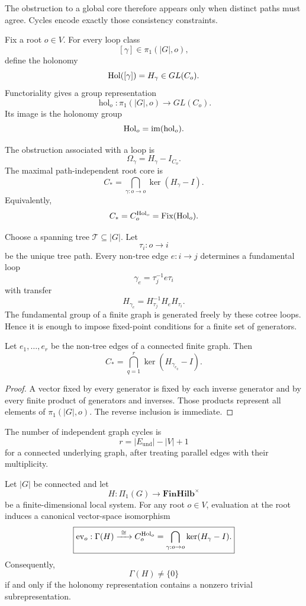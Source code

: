 The obstruction to a global core therefore appears only when distinct paths
must agree. Cycles encode exactly those consistency constraints.


Fix a root \(o\in V\). For every loop class
\[
[\gamma]\in\pi_1(|G|,o),
\]
define the holonomy
\[
\operatorname{Hol}([\gamma])=H_\gamma\in GL(C_o).
\]
Functoriality gives a group representation
\[
\operatorname{hol}_o:
\pi_1(|G|,o)\longrightarrow GL(C_o).
\]
Its image is the holonomy group
\[
\operatorname{Hol}_o=\operatorname{im}(\operatorname{hol}_o).
\]

The obstruction associated with a loop is
\[
\Omega_\gamma=H_\gamma-I_{C_o}.
\]
The maximal path-independent root core is
\[
\boxed{
C_*
=
\bigcap_{\gamma:o\to o}\ker(H_\gamma-I).
}
\]
Equivalently,
\[
C_*=C_o^{\operatorname{Hol}_o}=\operatorname{Fix}(\operatorname{Hol}_o).
\]


Choose a spanning tree \(\mathcal T\subseteq|G|\). Let
\[
\tau_i:o\to i
\]
be the unique tree path. Every non-tree edge \(e:i\to j\) determines a
fundamental loop
\[
\gamma_e=\tau_j^{-1}e\tau_i
\]
with transfer
\[
H_{\gamma_e}=H_{\tau_j}^{-1}H_eH_{\tau_i}.
\]
The fundamental group of a finite graph is generated freely by these cotree
loops. Hence it is enough to impose fixed-point conditions for a finite set of
generators.

\begin{lemma}\label{lem:finite-obstruction}
Let \(e_1,\ldots,e_r\) be the non-tree edges of a connected finite graph.
Then
\[
C_*
=
\bigcap_{q=1}^{r}
\ker(H_{\gamma_{e_q}}-I).
\]
\end{lemma}

\begin{proof}
A vector fixed by every generator is fixed by each inverse generator and by
every finite product of generators and inverses. Those products represent all
elements of \(\pi_1(|G|,o)\). The reverse inclusion is immediate.
\end{proof}

The number of independent graph cycles is
\[
r=|E_{\mathrm{und}}|-|V|+1
\]
for a connected underlying graph, after treating parallel edges with their
multiplicity.


\begin{theorem}\label{thm:limit-holonomy}
Let \(|G|\) be connected and let
\[
H:\Pi_1(G)\to\mathbf{FinHilb}^{\times}
\]
be a finite-dimensional local system. For any root \(o\in V\), evaluation at
the root induces a canonical vector-space isomorphism
\[
\boxed{
\operatorname{ev}_o:\Gamma(H)
\xrightarrow{\ \cong\ }
C_o^{\operatorname{Hol}_o}
=
\bigcap_{\gamma:o\to o}\ker(H_\gamma-I).
}
\]
Consequently,
\[
\Gamma(H)\neq\{0\}
\]
if and only if the holonomy representation contains a nonzero trivial
subrepresentation.
\end{theorem}

